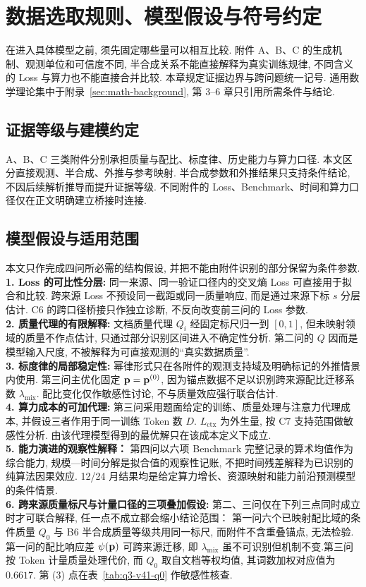 \section{数据选取规则、模型假设与符号约定}\label{sec:data-notation}

在进入具体模型之前, 须先固定哪些量可以相互比较. 附件 A、B、C 的生成机制、观测单位和可信度不同, 半合成关系不能直接解释为真实训练规律, 不同含义的 Loss 与算力也不能直接合并比较. 本章规定证据边界与跨问题统一记号. 通用数学理论集中于附录~\ref{sec:math-background}, 第 3--6 章只引用所需条件与结论. 

\subsection{证据等级与建模约定}
A、B、C 三类附件分别承担质量与配比、标度律、历史能力与算力口径. 本文区分直接观测、半合成、外推与参考映射. 半合成参数和外推结果只支持条件结论, 不因后续解析推导而提升证据等级. 不同附件的 Loss、Benchmark、时间和算力口径仅在正文明确建立桥接时连接. 

\subsection{模型假设与适用范围}
本文只作完成四问所必需的结构假设, 并把不能由附件识别的部分保留为条件参数. \\
\textbf{1. Loss 的可比性分层:} 同一来源、同一验证口径内的交叉熵 Loss 可直接用于拟合和比较. 跨来源 Loss 不预设同一截距或同一质量响应, 而是通过来源下标 $s$ 分层估计. C6 的跨口径桥接只作独立诊断, 不反向改变前三问的 Loss 参数.\\ 
\textbf{2. 质量代理的有限解释:} 文档质量代理 $Q_i$ 经固定标尺归一到 $[0, 1]$, 但未映射领域的质量不作点估计, 只通过部分识别区间进入不确定性分析. 第二问的 $Q$ 因而是模型输入尺度, 不被解释为可直接观测的“真实数据质量”. \\
\textbf{3. 标度律的局部稳定性:} 幂律形式只在各附件的观测支持域及明确标记的外推情景内使用. 第三问主优化固定 $\mathbf p=\mathbf p^{(0)}$, 因为锚点数据不足以识别跨来源配比迁移系数 $\lambda_{\mathrm{mix}}$. 配比变化仅作敏感性讨论, 不与质量效应强行联合估计. \\
\textbf{4. 算力成本的可加代理:} 第三问采用题面给定的训练、质量处理与注意力代理成本, 并假设三者作用于同一训练 Token 数 $D$. $L_{\mathrm{ctx}}$ 为外生量, 按 C7 支持范围做敏感性分析. 由该代理模型得到的最优解只在该成本定义下成立. \\
\textbf{5. 能力演进的观察性解释：} 第四问以六项 Benchmark 完整记录的算术均值作为综合能力, 规模—时间分解是拟合值的观察性记账, 不把时间残差解释为已识别的纯算法因果效应. 12/24 月结果均是给定算力增长、资源映射和能力前沿预测模型的条件情景. \\
\textbf{6. 跨来源质量标尺与计量口径的三项叠加假设:} 第二、三问仅在下列三点同时成立时才可联合解释, 任一点不成立都会缩小结论范围：
\setcounter{obsitem}{0}
\obsitem{}第一问六个已映射配比域的条件质量 $Q_0$ 与 B6 半合成质量等级共用同一标尺, 而附件不含重叠锚点, 无法检验.\obsitem{}第一问的配比响应差 $\psi(\mathbf p)$ 可跨来源迁移, 即 $\lambda_{\mathrm{mix}}$ 虽不可识别但机制不变.\obsitem{}第三问按 Token 计量质量处理代价, 而 $Q_0$ 取自文档等权均值, 其词数加权对应值为 $0.6617$. 第 (3) 点在表~\ref{tab:q3-v41-q0} 作敏感性核查. 

